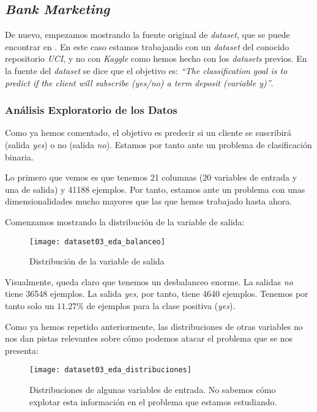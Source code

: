 \documentclass[11pt]{article}
\begin{document}
\pagebreak

\subsection{\emph{Bank Marketing}}

De nuevo, empezamos mostrando la fuente original de \emph{dataset}, que se puede encontrar en \cite{bank_marketing_source:online}. En este caso estamos trabajando con un \emph{dataset} del conocido repositorio \emph{UCI}, y no con \emph{Kaggle} como hemos hecho con los \emph{datasets} previos. En la fuente del \emph{dataset} \cite{bank_marketing_source:online} se dice que el objetivo es: \emph{``The classification goal is to predict if the client will subscribe (yes/no) a term deposit (variable y)''}.

\subsubsection{Análisis Exploratorio de los Datos}

Como ya hemos comentado, el objetivo es predecir si un cliente se suscribirá (salida \emph{yes}) o no (salida \emph{no}). Estamos por tanto ante un problema de clasificación binaria.

Lo primero que vemos es que tenemos 21 columnas (20 variables de entrada y una de salida) y 41188 ejemplos. Por tanto, estamos ante un problema con unas dimensionalidades mucho mayores que las que hemos trabajado hasta ahora.

Comenzamos mostrando la distribución de la variable de salida:

\begin{figure}[H]
    \centering
    \texttt{[image: dataset03\_eda\_balanceo]}
    \caption{Distribución de la variable de salida}
\end{figure}

Visualmente, queda claro que tenemos un desbalanceo enorme. La salidas \emph{no} tiene 36548 ejemplos. La salida \emph{yes}, por tanto, tiene 4640 ejemplos. Tenemos por tanto solo un $11.27\%$ de ejemplos para la clase positiva (\emph{yes}).

Como ya hemos repetido anteriormente, las distribuciones de otras variables no nos dan pistas relevantes sobre cómo podemos atacar el problema que se nos presenta:

\begin{figure}[H]
    \centering
    \texttt{[image: dataset03\_eda\_distribuciones]}
    \caption{Distribuciones de algunas variables de entrada. No sabemos cómo explotar esta información en el problema que estamos estudiando.}
\end{figure}
\end{document}
